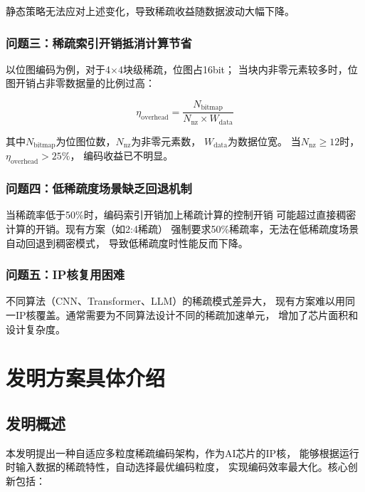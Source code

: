 \documentclass[a4paper,12pt,fontset=ubuntu]{ctexart}
\begin{document}
静态策略无法应对上述变化，导致稀疏收益随数据波动大幅下降。

\subsubsection{问题三：稀疏索引开销抵消计算节省}

以位图编码为例，对于4$\times$4块级稀疏，位图占16bit；
当块内非零元素较多时，位图开销占非零数据量的比例过高：

\begin{equation}
\eta_{\text{overhead}} = \frac{N_{\text{bitmap}}}{N_{\text{nz}} \times W_{\text{data}}}
\end{equation}

其中$N_{\text{bitmap}}$为位图位数，$N_{\text{nz}}$为非零元素数，
$W_{\text{data}}$为数据位宽。
当$N_{\text{nz}} \geq 12$时，$\eta_{\text{overhead}} > 25\%$，
编码收益已不明显。

\subsubsection{问题四：低稀疏度场景缺乏回退机制}

当稀疏率低于50\%时，编码索引开销加上稀疏计算的控制开销
可能超过直接稠密计算的开销。现有方案（如2:4稀疏）
强制要求50\%稀疏率，无法在低稀疏度场景自动回退到稠密模式，
导致低稀疏度时性能反而下降。

\subsubsection{问题五：IP核复用困难}

不同算法（CNN、Transformer、LLM）的稀疏模式差异大，
现有方案难以用同一IP核覆盖。通常需要为不同算法设计不同的稀疏加速单元，
增加了芯片面积和设计复杂度。

\section{发明方案具体介绍}

\subsection{发明概述}

本发明提出一种自适应多粒度稀疏编码架构，作为AI芯片的IP核，
能够根据运行时输入数据的稀疏特性，自动选择最优编码粒度，
实现编码效率最大化。核心创新包括：
\end{document}
